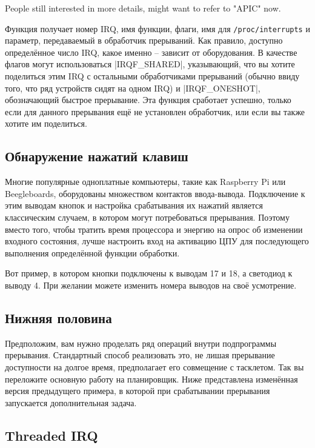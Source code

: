 \documentclass[10pt, oneside]{book}
\begin{document}
People still interested in more details, might want to refer to "APIC" now.

Функция получает номер IRQ, имя функции, флаги, имя для \verb|/proc/interrupts| и параметр, передаваемый в обработчик прерываний. Как правило,
доступно определённое число IRQ, какое именно – зависит от оборудования. В качестве флагов могут использоваться \cpp|IRQF_SHARED|, указывающий, что вы хотите поделиться этим IRQ с остальными обработчиками прерываний (обычно ввиду того, что ряд устройств сидят на одном IRQ) и \cpp|IRQF_ONESHOT|, обозначающий быстрое прерывание. Эта функция сработает успешно, только если для данного прерывания ещё не установлен обработчик, или если вы также хотите им поделиться.

\subsection{Обнаружение нажатий клавиш}
\label{sec:detect_button}
Многие популярные одноплатные компьютеры, такие как Raspberry Pi или Beegleboards, оборудованы множеством контактов ввода-вывода. Подключение к этим выводам кнопок и настройка срабатывания их нажатий является классическим случаем, в котором могут потребоваться прерывания. Поэтому вместо того, чтобы тратить время процессора и энергию на опрос об изменении входного состояния, лучше настроить вход на активацию ЦПУ для последующего выполнения определённой функции обработки.

Вот пример, в котором кнопки подключены к выводам 17 и 18, а светодиод к выводу 4. При желании можете изменить номера выводов на своё усмотрение.


\subsection{Нижняя половина}
\label{sec:bottom_half}
Предположим, вам нужно проделать ряд операций внутри подпрограммы прерывания. Стандартный способ реализовать это, не лишая прерывание доступности на долгое время, предполагает его совмещение с тасклетом. Так вы переложите основную работу на планировщик.
Ниже представлена изменённая версия предыдущего примера, в которой при срабатывании прерывания запускается дополнительная задача.


\subsection{Threaded IRQ}
\end{document}
